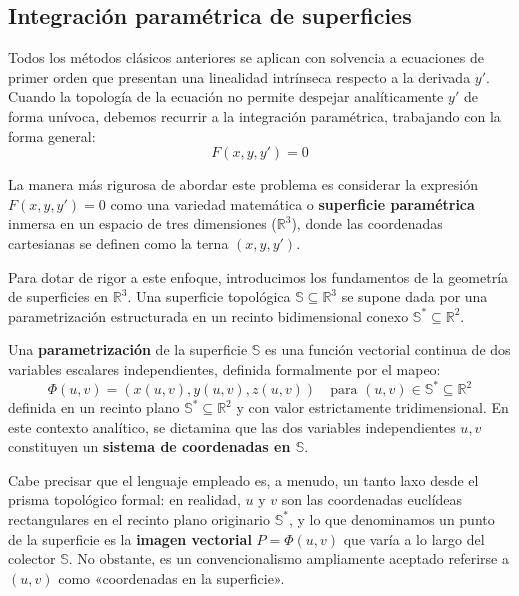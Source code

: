 \subsection{Integración paramétrica de superficies}

Todos los métodos clásicos anteriores se aplican con solvencia a ecuaciones de primer orden que presentan una linealidad intrínseca respecto a la derivada $y'$. Cuando la topología de la ecuación no permite despejar analíticamente $y'$ de forma unívoca, debemos recurrir a la integración paramétrica, trabajando con la forma general:
$$ F(x,y,y') = 0 $$

La manera más rigurosa de abordar este problema es considerar la expresión $F(x,y,y') = 0$ como una variedad matemática o \textbf{superficie paramétrica} inmersa en un espacio de tres dimensiones ($\mathbb{R}^3$), donde las coordenadas cartesianas se definen como la terna $(x,y,y')$.

Para dotar de rigor a este enfoque, introducimos los fundamentos de la geometría de superficies en $\mathbb{R}^3$. Una superficie topológica $\mathbb{S} \subseteq \mathbb{R}^3$ se supone dada por una parametrización estructurada en un recinto bidimensional conexo $\mathbb{S}^* \subseteq \mathbb{R}^2$. 

\begin{definicion}
Una \textbf{parametrización} de la superficie $\mathbb{S}$ es una función vectorial continua de dos variables escalares independientes, definida formalmente por el mapeo:
$$ \Phi(u,v) = (x(u,v), y(u,v), z(u,v)) \quad \text{para } (u,v) \in \mathbb{S}^* \subseteq \mathbb{R}^2 $$
definida en un recinto plano $\mathbb{S}^* \subseteq \mathbb{R}^2$ y con valor estrictamente tridimensional. En este contexto analítico, se dictamina que las dos variables independientes $u,v$ constituyen un \textbf{sistema de coordenadas en $\mathbb{S}$}. 
\end{definicion}

Cabe precisar que el lenguaje empleado es, a menudo, un tanto laxo desde el prisma topológico formal: en realidad, $u$ y $v$ son las coordenadas euclídeas rectangulares en el recinto plano originario $\mathbb{S}^*$, y lo que denominamos un punto de la superficie es la \textbf{imagen vectorial} $P = \Phi(u,v)$ que varía a lo largo del colector $\mathbb{S}$. No obstante, es un convencionalismo ampliamente aceptado referirse a $(u,v)$ como «coordenadas en la superficie».

